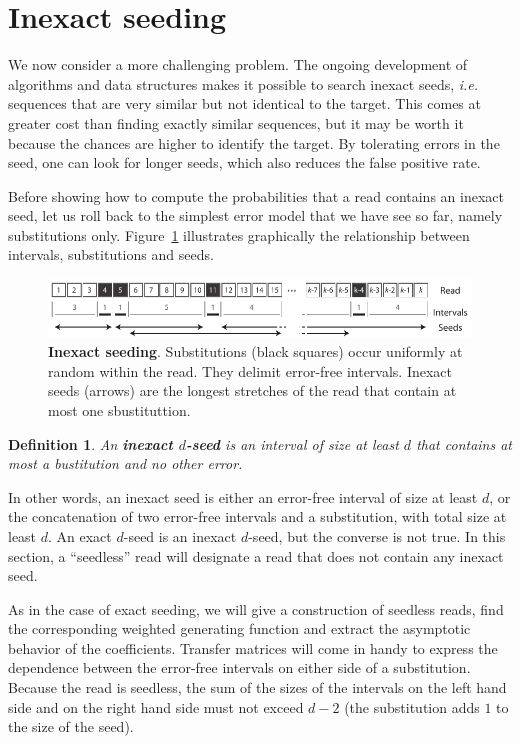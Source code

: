 \documentclass{article}
\newtheorem{definition}{Definition}
\begin{document}
\section{Inexact seeding}

We now consider a more challenging problem. The ongoing development of
algorithms and data structures makes it possible to search inexact seeds,
\textit{i.e.} sequences that are very similar but not identical to the
target. This comes at greater cost than finding exactly similar sequences,
but it may be worth it because the chances are higher to identify the
target. By tolerating errors in the seed, one can look for longer seeds,
which also reduces the false positive rate.

Before showing how to compute the probabilities that a read contains
an inexact seed, let us roll back to the simplest error model that we have
see so far, namely substitutions only. Figure~\ref{fig:sketchinexact}
illustrates graphically the relationship between intervals, substitutions
and seeds.

\begin{figure}[h]
\centering
\includegraphics[scale=0.88]{sketch_inexact_seeding.pdf}
\caption{\textbf{Inexact seeding}. Substitutions (black squares) occur
uniformly at random within the read. They delimit error-free intervals.
Inexact seeds (arrows) are the longest stretches of the read that contain
at most one sbustituttion.}
\label{fig:sketchinexact}
\end{figure}


\begin{definition}
\label{def:seed}
An \textbf{inexact $d$-seed} is an interval of size at least $d$ that
contains at most a bustitution and no other error.
\end{definition}

In other words, an inexact seed is either an error-free interval of size
at least $d$, or the concatenation of two error-free intervals and a
substitution, with total size at least $d$. An exact $d$-seed is an
inexact $d$-seed, but the converse is not true. In this section, a
``seedless'' read will designate a read that does not contain any inexact
seed.

As in the case of exact seeding, we will give a construction of seedless
reads, find the corresponding weighted generating function and extract the
asymptotic behavior of the coefficients. Transfer matrices will come in
handy to express the dependence between the error-free intervals on either
side of a substitution. Because the read is seedless, the sum of the sizes
of the intervals on the left hand side and on the right hand side must not
exceed $d-2$ (the substitution adds $1$ to the size of the seed).
\end{document}
